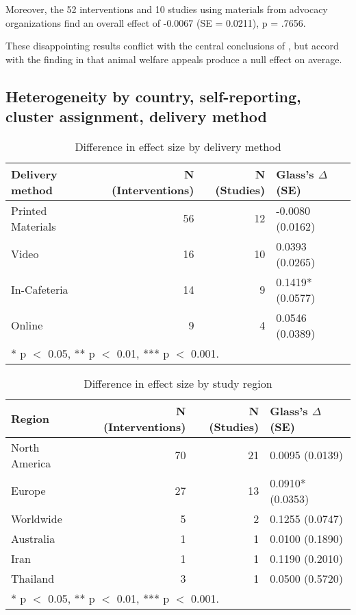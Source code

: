 \documentclass[sn-nature,pdflatex]{sn-jnl}
\begin{document}
Moreover, the 52 interventions and 10 studies using materials from
advocacy organizations find an overall effect of -0.0067 (SE = 0.0211),
p = .7656.

These disappointing results conflict with the central conclusions of
\citep{mathur2021effectiveness}, but accord with the finding in
\citep{DiGennaro2024} that animal welfare appeals produce a null effect
on average.

\subsection{Heterogeneity by country, self-reporting, cluster
assignment, delivery method}\label{sec2.10}

\begin{table}[!h]
\centering
\caption{\label{tab:tab:table_three}Difference in effect size by delivery method}
\centering
\begin{tabular}[t]{lrrl}
\toprule
Delivery method & N (Interventions) & N (Studies) & Glass's $\Delta$ (SE)\\
\midrule
Printed Materials & 56 & 12 & -0.0080 (0.0162)\\
Video & 16 & 10 & 0.0393 (0.0265)\\
In-Cafeteria & 14 & 9 & 0.1419* (0.0577)\\
Online & 9 & 4 & 0.0546 (0.0389)\\
\bottomrule
\multicolumn{4}{l}{\rule{0pt}{1em}* p $<$ 0.05, ** p $<$ 0.01, *** p $<$ 0.001.}\\
\end{tabular}
\end{table}

\begin{table}[!h]
\centering
\caption{\label{tab:tab:table_five}Difference in effect size by study region}
\centering
\begin{tabular}[t]{lrrl}
\toprule
Region & N (Interventions) & N (Studies) & Glass's $\Delta$ (SE)\\
\midrule
North America & 70 & 21 & 0.0095 (0.0139)\\
Europe & 27 & 13 & 0.0910* (0.0353)\\
Worldwide & 5 & 2 & 0.1255 (0.0747)\\
Australia & 1 & 1 & 0.0100 (0.1890)\\
Iran & 1 & 1 & 0.1190 (0.2010)\\
\addlinespace
Thailand & 3 & 1 & 0.0500 (0.5720)\\
\bottomrule
\multicolumn{4}{l}{\rule{0pt}{1em}* p $<$ 0.05, ** p $<$ 0.01, *** p $<$ 0.001.}\\
\end{tabular}
\end{table}
\end{document}

